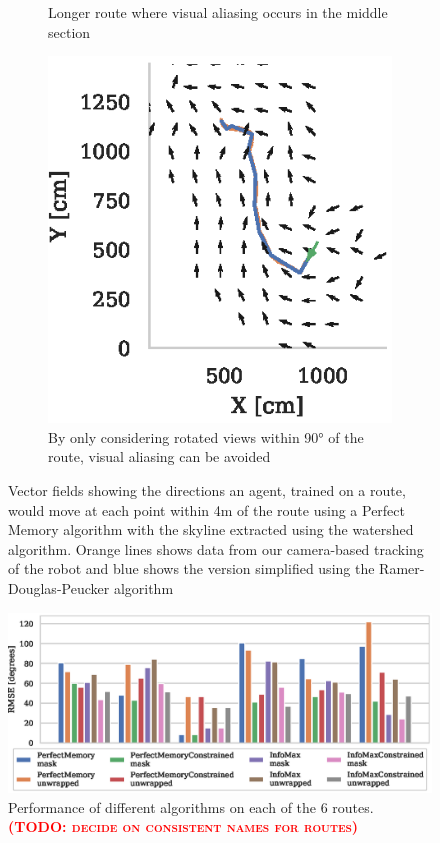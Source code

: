 \documentclass[letterpaper]{article}
\newcommand{\todo}[1]{\textbf{\textsc{\textcolor{red}{(TODO: #1)}}}}
\begin{document}
\begin{figure}[t]
\begin{subfigure}[b]{0.3\textwidth}
        \caption{Longer route where visual aliasing occurs in the middle section}
        \label{fig:vector_fields/route5_perfect_memory_mask}
    \end{subfigure}
    \begin{subfigure}[b]{0.3\textwidth}
        \includegraphics{figures/vector_field_route5_PerfectMemoryConstrained_mask.eps}
        \caption{By only considering rotated views within 90° of the route, visual aliasing can be avoided}
        \label{fig:vector_fields/route5_perfect_memory_constained_mask}
    \end{subfigure}
    
    \caption{Vector fields showing the directions an agent, trained on a route, would move at each point within 4m of the route using a Perfect Memory algorithm with the skyline extracted using the watershed algorithm. 
    Orange lines shows data from our camera-based tracking of the robot and blue shows the version simplified using the Ramer-Douglas-Peucker algorithm~\citep{Ramer1972}}
    \label{vector_fields}
\end{figure}
    
\begin{figure}[t]
    \centering
    \includegraphics{figures/route_benchmark.eps}
    \caption{Performance of different algorithms on each of the 6 routes. \todo{decide on consistent names for routes}}
    \label{route_benchmark}
\end{figure}
\end{document}
